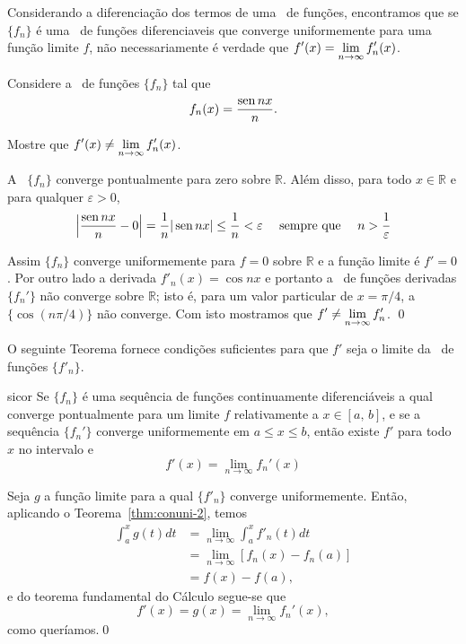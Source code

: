 Considerando a diferenciação dos termos de uma \seq\ de funções,
encontramos que se $\{f_n\}$ é uma \seq\ de funções diferenciaveis
que converge uniformemente para uma função limite $f$, não
necessariamente é verdade que
$\displaystyle{f'(x)=\lim_{n\to\infty}f_n'(x)}$.
\begin{exer}
Considere a \seq\ de funções $\{f_n\}$ tal que
\begin{equation*}
    f_n(x)=\frac{\operatorname{sen} nx}{n}.
\end{equation*}

Mostre que $\displaystyle{f'(x)\neq\lim_{n\to\infty}f_n'(x)}$.
\end{exer}

\solo A \seq\ $\{f_n\}$ converge pontualmente para zero sobre
$\mathbb{R}$. Além disso, para todo $x\in \mathbb{R}$ e para
qualquer $\varepsilon>0$,
\begin{equation*}
    \left|\frac{\operatorname{sen} nx}{n}-0 \right|=\frac{1}{n}|\operatorname{sen} nx|\le
    \frac{1}{n}<\varepsilon\quad \text{ sempre que }\quad n>\frac{1}{\varepsilon}
\end{equation*}

Assim $\{f_n\}$ converge uniformemente para $f=0$ sobre
$\mathbb{R}$ e a função limite é $f'=0$. Por outro lado a derivada
$f'_n(x)=\cos nx$ e portanto a \seq\ de funções derivadas
$\{f_n'\}$ não converge sobre $\mathbb{R}$; isto é, para um valor
particular de $x=\pi/4$, a \seq\ $\{\cos (n\pi/4)\}$ não converge.
Com isto mostramos que $\displaystyle{f'\neq\lim_{n\to\infty}f_n'}$. \qed

O seguinte Teorema fornece condições suficientes para que $f'$
seja o limite da \seq\ de funções $\{f'_n\}$.

\begin{theoc}{}{sicor}
Se $\{f_n\}$ é uma sequência de funções continuamente
diferenciáveis a qual converge pontualmente para um limite $f$
relativamente a $x\in [a,\, b]$, e se a sequência $\{f_n'\}$
converge uniformemente em $a \leq  x\leq  b$, então existe $f'$
para todo $x$ no intervalo e
\[
f'(x) =\lim_{n\to\infty} f_n'(x)
\]
\end{theoc}

\prova Seja $g$ a função limite para a qual $\{f'_n\}$ converge
uniformemente. Então, aplicando o Teorema~\ref{thm:conuni-2}, temos
\begin{align*}
\int_a^x g(t) dt &= \lim_{n\to\infty}\int_a^x  f'_n(t) dt \\[2ex]
&= \lim_{n\to\infty} [f_n(x) - f_n(a)]\\[2ex]
& = f(x) - f(a),
\end{align*}
e do teorema fundamental do Cálculo segue-se que
\[
f'(x) = g(x)=\lim_{n\to\infty}f_n'(x),
\]
como queríamos.\qed

